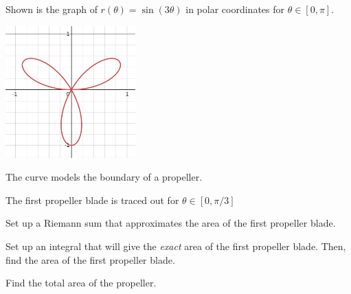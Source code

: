 \documentclass{workbook}
\begin{document}
\begin{slide}
	\question

		Shown is the graph of $\displaystyle
		r(\theta)=\sin(3\theta)
		$
		in polar coordinates
		for $\theta\in[0,\pi]$.
		\begin{center}
	\includegraphics[height=2in]{images/parametric2.png}
		\end{center}

	
	The curve models the boundary of a propeller.

	\begin{parts}
		\item The first propeller blade is traced out for $\theta\in[0,\pi/3]$
		
		Set up a Riemann sum that approximates the area of the first propeller
		blade.

		\item Set up an integral that will give the \emph{exact} area of the
		first propeller blade. Then, find the area of the first propeller blade.

		\item Find the total area of the propeller.
	\end{parts}
\end{slide}
\end{document}
